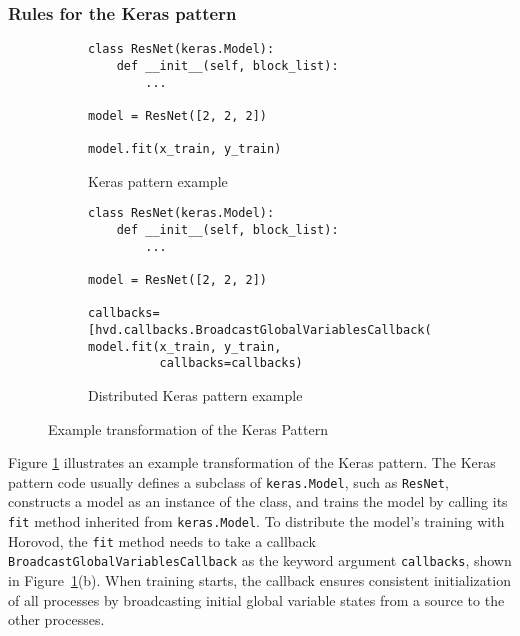 
   


\subsubsection{Rules for the Keras pattern}

\begin{figure}[ht!]\centering
  \begin{subfigure}[t]{0.8\textwidth}
  \begin{lstlisting}[style=mpython]
class ResNet(keras.Model):
    def __init__(self, block_list):
        ...

model = ResNet([2, 2, 2])

model.fit(x_train, y_train)\end{lstlisting}
  \caption{Keras pattern example}
  \end{subfigure}
  \hspace{3mm}
  \begin{subfigure}[t]{0.8\textwidth}
  \begin{lstlisting}[style=mpython]
class ResNet(keras.Model):
    def __init__(self, block_list):
        ...

model = ResNet([2, 2, 2])

callbacks=[hvd.callbacks.BroadcastGlobalVariablesCallback(0)]
model.fit(x_train, y_train,
          callbacks=callbacks)\end{lstlisting}
    \caption{Distributed Keras pattern example}
  \end{subfigure}
  \caption{Example transformation of the Keras Pattern}
  \label{fig:trans:keras}
\end{figure}


Figure \ref{fig:trans:keras} illustrates an example transformation of the Keras
pattern.
The Keras pattern code usually defines a subclass of {\tt keras.Model}, such
as {\tt ResNet}, constructs a model as an instance of the class, and trains the
model by calling its {\tt fit} method inherited from {\tt keras.Model}.
To distribute the model's training with Horovod, the {\tt fit} method needs to
take a callback {\tt BroadcastGlobalVariablesCallback} as the keyword argument
{\tt callbacks}, shown in Figure~\ref{fig:trans:keras}(b).
When training starts, the callback ensures consistent initialization of all
processes by broadcasting initial global variable states from a source to the
other processes.


